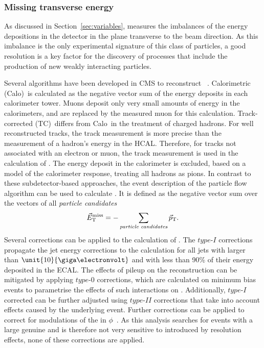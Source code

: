 \subsubsection{Missing transverse energy}
As discussed in Section~\ref{sec:variables}, \MET measures the imbalances of the energy depositions in the detector in the plane transverse to the beam direction. As this imbalance is the only experimental signature of this class of particles, a good \MET resolution is a key factor for the discovery of processes that include the production of new weakly interacting particles. 

Several algorithms have been developed in CMS to reconstruct \MET~\cite{7TeVMETPaper}. Calorimetric (Calo)~\METVec is calculated as the negative vector sum of the energy deposits in each calorimeter tower. Muons deposit only very small amounts of energy in the calorimeters, and are replaced by the measured muon \pt for this calculation.  Track-corrected (TC)~\METVec differs from Calo~\METVec in the treatment of charged hadrons. For well reconstructed tracks, the track measurement is more precise than the measurement of a hadron's energy in the HCAL. Therefore, for tracks not associated with an electron or  muon, the track measurement is used in the calculation of \METVec. The energy deposit in the calorimeter is excluded, based on a model of the calorimeter response, treating all hadrons as pions. In contrast to these subdetector-based approaches, the event description of the particle flow algorithm can be used to calculate \METVec. It is defined as the negative vector sum over the \pt vectors of all \textit{particle candidates}
\begin{equation}
 \vec{E}_{\mathrm{T}}^{\mathrm{miss}} = - \sum\limits_{\textit{particle candidates}} \vec{p}_\mathrm{T}.
\end{equation}
Several corrections can be applied to the calculation of \MET. The $\textit{type-I}$ corrections propagate the jet energy corrections  to the \MET calculation for all jets with \pt larger than $\unit{10}{\giga\electronvolt}$ and with less than 90\% of their energy deposited in the ECAL. The effects of pileup on the \MET reconstruction can be mitigated by applying $\textit{type-0}$ corrections, which are calculated on minimum bias events to parametrise the effects of such interactions on \MET. Additionally, $\textit{type-I}$ corrected \MET can be further adjusted using $\textit{type-II}$ corrections that take into account effects caused by the underlying event. Further corrections can be applied to correct for modulations of the \MET in $\phi$~\cite{CMS-PAS-JME-12-002}. As this analysis searches for events with a large genuine \MET and is therefore not very sensitive to \MET introduced by resolution effects, none of these corrections are applied. 

